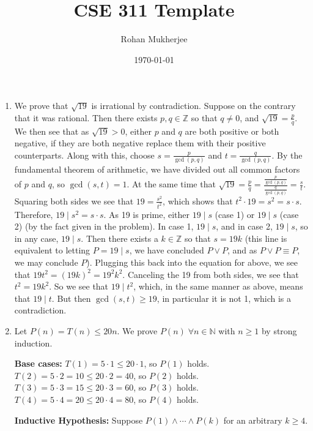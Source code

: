\documentclass[12pt]{article}
\title{CSE 311 Template}
\date{\today}
\author{Rohan Mukherjee}
\def\mbb#1{\mathbb{#1}}
\def\bN{\mbb{N}}
\def\bZ{\mbb{Z}}
\theoremstyle{definition}
\theoremstyle{remark}
\newcommand\setItemnumber[1]{\setcounter{enumi}{\numexpr#1-1\relax}}
\begin{document}
	\maketitle
	\begin{enumerate}[leftmargin=\labelsep]
		\setItemnumber{2}
		\item We prove that $\sqrt{19}$ is irrational by contradiction. Suppose on the contrary that it was rational. Then there exists $p, q \in \bZ$ so that $q \neq 0$, and $\sqrt{19} = \frac pq$. We then see that as $\sqrt{19} > 0$, either $p$ and $q$ are both positive or both negative, if they are both negative replace them with their positive counterparts. Along with this, choose $s = \frac{p}{\gcd(p, q)}$ and $t = \frac{q}{\gcd(p, q)}$. By the fundamental theorem of arithmetic, we have divided out all common factors of $p$ and $q$, so $\gcd(s, t) = 1$. At the same time that $\sqrt{19} = \frac pq = \frac{\frac{p}{\gcd(p, q)}}{\frac{q}{\gcd(p, q)}} = \frac{s}{t}$. Squaring both sides we see that $19 = \frac{s^2}{t^2}$, which shows that $t^2 \cdot 19 = s^2 = s \cdot s$. Therefore, $19 \mid s^2=s \cdot s$. As 19 is prime, either $19 \mid s$ (case 1) or $19 \mid s$ (case 2) (by the fact given in the problem). In case 1, $19 \mid s$, and in case 2, $19 \mid s$, so in any case, $19 \mid s$. Then there exists a $k \in \bZ$ so that $s = 19k$ (this line is equivalent to letting $P = 19 \mid s$, we have concluded $P \lor P$, and as $P \lor P \equiv P$, we may conclude $P$). Plugging this back into the equation for above, we see that $19t^2 = (19k)^2 = 19^2k^2$. Canceling the 19 from both sides, we see that $t^2 = 19 k^2$. So we see that $19 \mid t^2$, which, in the same manner as above, means that $19 \mid t$. But then $\gcd(s, t) \geq 19$, in particular it is not 1, which is a contradiction.
		
		\newpage
		\item Let $P(n) = T(n) \leq 20n$. We prove $P(n) \; \forall n \in \bN$ with $n \geq 1$ by strong induction.
		
		\textbf{Base cases: } $T(1) = 5\cdot 1 \leq 20 \cdot 1$, so $P(1)$ holds. $T(2) = 5 \cdot 2 = 10 \leq 20 \cdot 2 = 40$, so $P(2)$ holds. $T(3) = 5 \cdot 3 = 15 \leq 20 \cdot 3 = 60$, so $P(3)$ holds. $T(4) = 5 \cdot 4 = 20 \leq 20 \cdot 4 = 80$, so $P(4)$ holds.
		
		\textbf{Inductive Hypothesis: } Suppose $P(1) \land \cdots  \land P(k)$ for an arbitrary $k \geq 4$. 
		

\end{enumerate}
\end{document}
